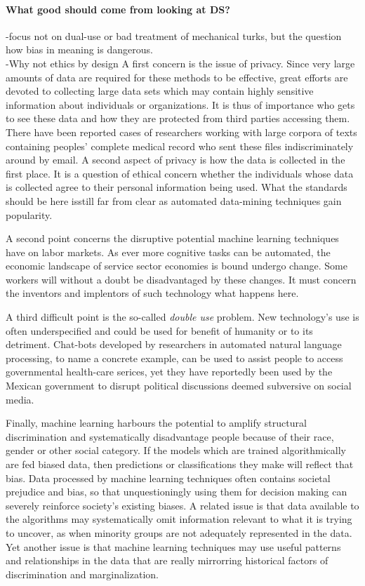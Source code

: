 \documentclass{article}
\begin{document}
\paragraph{What good should come from looking at DS?}
-focus not on dual-use or bad treatment of mechanical turks, but the question how bias in meaning is dangerous.\\
-Why not ethics by design
A first concern is the issue of privacy. Since very large amounts of data are required for these methods to be effective, great efforts are devoted to collecting large data sets which may contain highly sensitive information about individuals or organizations. It is thus of importance who gets to see these data and how they are protected from third parties accessing them. There have been reported cases of researchers working with large corpora of texts containing peoples' complete medical record who sent these files indiscriminately around by email. A second aspect of privacy is how the data is collected in the first place. It is a question of ethical concern whether the individuals whose data is collected agree to their personal information being used. What the standards should be here isstill  far from clear as automated data-mining techniques gain popularity.

A second point concerns the disruptive potential machine learning techniques have on labor markets. As ever more cognitive tasks can be automated, the economic landscape of service sector economies is bound undergo change. Some workers will without a doubt be disadvantaged by these changes. It must concern the inventors and implentors of such technology what happens here.

A third difficult point is the so-called \emph{double use} problem. New technology's use is often underspecified and could be used for benefit of humanity or to its detriment. Chat-bots developed by researchers in automated natural language processing, to name a concrete example, can be used to assist people to access governmental health-care serices, yet they have reportedly been used by the Mexican government to disrupt political discussions deemed subversive on social media. \cite{leidner2017ethical}

Finally, machine learning harbours the potential to amplify structural discrimination and systematically disadvantage people because of their race, gender or other social category. If the models which are trained algorithmically are fed biased data, then predictions or classifications they make will reflect that bias.
Data processed by machine learning techniques often contains societal prejudice and bias, so that unquestioningly using them for decision making can severely reinforce society's existing biases. A related issue is that data available to the algorithms may systematically omit information relevant to what it is trying to uncover, as when minority groups are not adequately represented in the data. Yet another issue is that machine learning techniques may use useful patterns and relationships in the data that are really mirrorring historical factors of discrimination and marginalization. \cite{barocas2016big}
\end{document}
